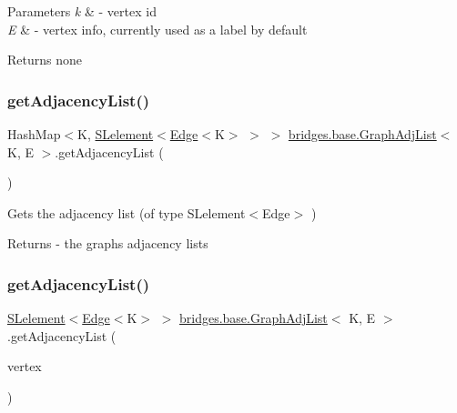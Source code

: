 \begin{DoxyParams}{Parameters}
{\em k} & -\/ vertex id \\
\hline
{\em E} & -\/ vertex info, currently used as a label by default\\
\hline
\end{DoxyParams}
\begin{DoxyReturn}{Returns}
none 
\end{DoxyReturn}
\hypertarget{classbridges_1_1base_1_1_graph_adj_list_a61ebebad4b053797240fef2b42b57630}{}\label{classbridges_1_1base_1_1_graph_adj_list_a61ebebad4b053797240fef2b42b57630} 
\subsubsection{\texorpdfstring{get\+Adjacency\+List()}{getAdjacencyList()}\hspace{0.1cm}{\footnotesize\ttfamily [1/2]}}
{\footnotesize\ttfamily Hash\+Map$<$K, \hyperlink{classbridges_1_1base_1_1_s_lelement}{S\+Lelement}$<$\hyperlink{classbridges_1_1base_1_1_edge}{Edge}$<$K$>$ $>$ $>$ \hyperlink{classbridges_1_1base_1_1_graph_adj_list}{bridges.\+base.\+Graph\+Adj\+List}$<$ K, E $>$.get\+Adjacency\+List (\begin{DoxyParamCaption}{ }\end{DoxyParamCaption})}

Gets the adjacency list (of type S\+Lelement$<$\+Edge$>$ )

\begin{DoxyReturn}{Returns}
-\/ the graph\textquotesingle{}s adjacency lists 
\end{DoxyReturn}
\hypertarget{classbridges_1_1base_1_1_graph_adj_list_a331531e9ce428c35321fae6df143fbcf}{}\label{classbridges_1_1base_1_1_graph_adj_list_a331531e9ce428c35321fae6df143fbcf} 
\subsubsection{\texorpdfstring{get\+Adjacency\+List()}{getAdjacencyList()}\hspace{0.1cm}{\footnotesize\ttfamily [2/2]}}
{\footnotesize\ttfamily \hyperlink{classbridges_1_1base_1_1_s_lelement}{S\+Lelement}$<$\hyperlink{classbridges_1_1base_1_1_edge}{Edge}$<$K$>$ $>$ \hyperlink{classbridges_1_1base_1_1_graph_adj_list}{bridges.\+base.\+Graph\+Adj\+List}$<$ K, E $>$.get\+Adjacency\+List (\begin{DoxyParamCaption}\item[{K}]{vertex }\end{DoxyParamCaption})}

